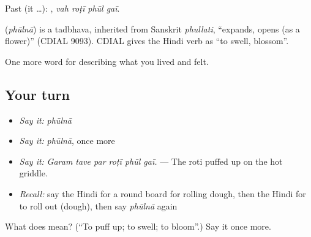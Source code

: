 Past (it …):    , \emph{vah roṭī phūl gaī}.

\begin{cousinweb}
\textbf{} (\emph{phūlnā}) is a tadbhava, inherited from Sanskrit \emph{phullati}, \textquotedblleft{}expands, opens (as a flower)\textquotedblright{} (CDIAL 9093). CDIAL gives the Hindi verb as \textquotedblleft{}to swell, blossom\textquotedblright{}.
\end{cousinweb}

\begin{grammarlens}[title={What you've built}]
One more word for describing what you lived and felt.
\end{grammarlens}

\subsection*{Your turn}
\begin{itemize}
\raggedright
  \item \emph{Say it:} \emph{phūlnā}
  \item \emph{Say it:} \emph{phūlnā}, once more
  \item \emph{Say it:} \emph{Garam tave par roṭī phūl gaī.} — The roti puffed up on the hot griddle.
  \item \emph{Recall:} say the Hindi for a round board for rolling dough, then the Hindi for to roll out (dough), then say \emph{phūlnā} again
\end{itemize}

\begin{tcolorbox}[breakable,colback=teal!4,colframe=teal!35!black,title={Before you move on}]
What does  mean? (\textquotedblleft{}To puff up; to swell; to bloom\textquotedblright{}.) Say it once more.
\end{tcolorbox}
